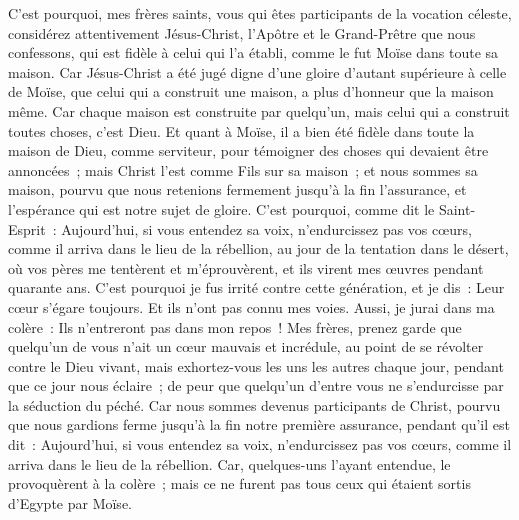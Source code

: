 \begin{multicols}{2}
\VerseOne{}C'est pourquoi, mes frères saints, vous qui êtes participants de la vocation céleste, considérez attentivement Jésus-Christ, l'Apôtre et le Grand-Prêtre que nous confessons,
qui est fidèle à celui qui l'a établi, comme le fut Moïse dans toute sa maison.
Car Jésus-Christ a été jugé digne d'une gloire d'autant supérieure à celle de Moïse, que celui qui a construit une maison, a plus d'honneur que la maison même.
Car chaque maison est construite par quelqu'un, mais celui qui a construit toutes choses, c'est Dieu.
Et quant à Moïse, il a bien été fidèle dans toute la maison de Dieu, comme serviteur, pour témoigner des choses qui devaient être annoncées~;
mais Christ l'est comme Fils sur sa maison~; et nous sommes sa maison, pourvu que nous retenions fermement jusqu'à la fin l'assurance, et l'espérance qui est notre sujet de gloire.
C'est pourquoi, comme dit le Saint-Esprit~: Aujourd'hui, si vous entendez sa voix,
n'endurcissez pas vos cœurs, comme il arriva dans le lieu de la rébellion, au jour de la tentation dans le désert,
où vos pères me tentèrent et m'éprouvèrent, et ils virent mes œuvres pendant quarante ans.
C'est pourquoi je fus irrité contre cette génération, et je dis~: Leur cœur s'égare toujours. Et ils n'ont pas connu mes voies.
Aussi, je jurai dans ma colère~: Ils n'entreront pas dans mon repos~!
Mes frères, prenez garde que quelqu'un de vous n'ait un cœur mauvais et incrédule, au point de se révolter contre le Dieu vivant,
mais exhortez-vous les uns les autres chaque jour, pendant que ce jour nous éclaire~; de peur que quelqu'un d'entre vous ne s'endurcisse par la séduction du péché.
Car nous sommes devenus participants de Christ, pourvu que nous gardions ferme jusqu'à la fin notre première assurance,
pendant qu'il est dit~: Aujourd'hui, si vous entendez sa voix, n'endurcissez pas vos cœurs, comme il arriva dans le lieu de la rébellion.
Car, quelques-uns l'ayant entendue, le provoquèrent à la colère~; mais ce ne furent pas tous ceux qui étaient sortis d'Egypte par Moïse. 

\end{multicols}
